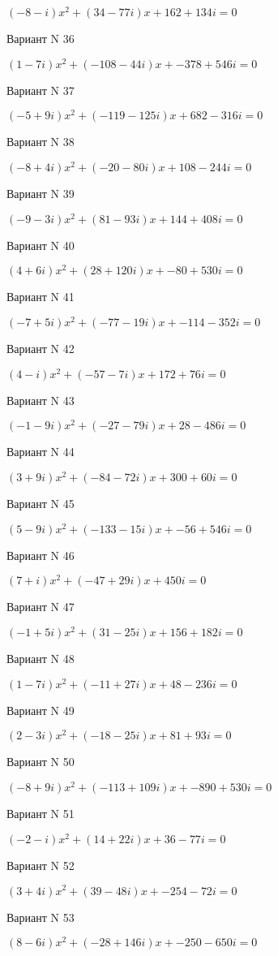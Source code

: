 \documentclass[11pt]{report}
\begin{document}
$(-8 - i)x^2 + (34 - 77 i)x + 162 + 134 i = 0$

Вариант N 36

$(1 - 7 i)x^2 + (-108 - 44 i)x + -378 + 546 i = 0$

Вариант N 37

$(-5 + 9 i)x^2 + (-119 - 125 i)x + 682 - 316 i = 0$

Вариант N 38

$(-8 + 4 i)x^2 + (-20 - 80 i)x + 108 - 244 i = 0$

Вариант N 39

$(-9 - 3 i)x^2 + (81 - 93 i)x + 144 + 408 i = 0$

Вариант N 40

$(4 + 6 i)x^2 + (28 + 120 i)x + -80 + 530 i = 0$

Вариант N 41

$(-7 + 5 i)x^2 + (-77 - 19 i)x + -114 - 352 i = 0$

Вариант N 42

$(4 - i)x^2 + (-57 - 7 i)x + 172 + 76 i = 0$

Вариант N 43

$(-1 - 9 i)x^2 + (-27 - 79 i)x + 28 - 486 i = 0$

Вариант N 44

$(3 + 9 i)x^2 + (-84 - 72 i)x + 300 + 60 i = 0$

Вариант N 45

$(5 - 9 i)x^2 + (-133 - 15 i)x + -56 + 546 i = 0$

Вариант N 46

$(7 + i)x^2 + (-47 + 29 i)x + 450 i = 0$

Вариант N 47

$(-1 + 5 i)x^2 + (31 - 25 i)x + 156 + 182 i = 0$

Вариант N 48

$(1 - 7 i)x^2 + (-11 + 27 i)x + 48 - 236 i = 0$

Вариант N 49

$(2 - 3 i)x^2 + (-18 - 25 i)x + 81 + 93 i = 0$

Вариант N 50

$(-8 + 9 i)x^2 + (-113 + 109 i)x + -890 + 530 i = 0$

Вариант N 51

$(-2 - i)x^2 + (14 + 22 i)x + 36 - 77 i = 0$

Вариант N 52

$(3 + 4 i)x^2 + (39 - 48 i)x + -254 - 72 i = 0$

Вариант N 53

$(8 - 6 i)x^2 + (-28 + 146 i)x + -250 - 650 i = 0$
\end{document}
